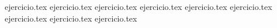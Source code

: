 \vspace{1em}
\begin{enumerate}
    \setcounter{enumi}{58}
    {ejercicio.tex}
    {ejercicio.tex}
    {ejercicio.tex}
    {ejercicio.tex}
    {ejercicio.tex}
    {ejercicio.tex}
    {ejercicio.tex}
    {ejercicio.tex}
    {ejercicio.tex}
\end{enumerate}
